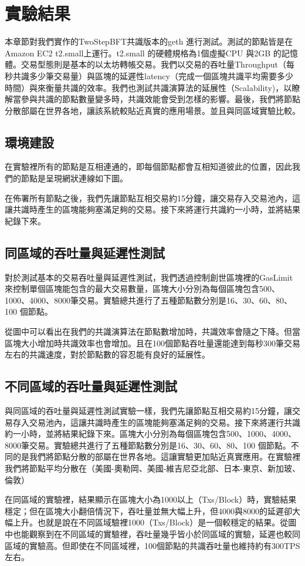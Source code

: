 \chapter{實驗結果} \label{se_6}
本章節對我們實作的TwoStepBFT共識版本的geth 進行測試。測試的節點皆是在Amazon EC2 t2.small上運行。t2.small 的硬體規格為1個虛擬CPU 與2GB 的記憶體。交易型態則是基本的以太坊轉帳交易。我們以交易的吞吐量Throughput（每秒共識多少筆交易量）與區塊的延遲性latency（完成一個區塊共識平均需要多少時間）與來衡量共識的效率。我們也測試共識演算法的延展性（Scalability)，以瞭解當參與共識的節點數量變多時，共識效能會受到怎樣的影響。最後，我們將節點分散部屬在世界各地，讓該系統較貼近真實的應用場景。並且與同區域實驗比較。
\section{環境建設}\label{se_6}
在實驗裡所有的節點是互相連通的，即每個節點都會互相知道彼此的位置，因此我們的節點是呈現網狀連線如下圖。

在佈署所有節點之後，我們先讓節點互相交易約15分鐘，讓交易存入交易池內，這讓共識時產生的區塊能夠塞滿足夠的交易。接下來將運行共識約一小時，並將結果紀錄下來。
\section{同區域的吞吐量與延遲性測試}\label{se_6}
對於測試基本的交易吞吐量與延遲性測試，我們透過控制創世區塊裡的GasLimit來控制單個區塊能包含的最大交易數量，區塊大小分別為每個區塊包含500、1000、4000、8000筆交易。實驗總共進行了五種節點數分別是16、30、60、80、100 個節點。
 
\newpage


從圖中可以看出在我們的共識演算法在節點數增加時，共識效率會隨之下降。但當區塊大小增加時共識效率也會增加。且在100個節點吞吐量還能達到每秒300筆交易左右的共識速度，對於節點數的容忍能有良好的延展性。



\section{不同區域的吞吐量與延遲性測試}\label{se_6}
與同區域的吞吐量與延遲性測試實驗一樣，我們先讓節點互相交易約15分鐘，讓交易存入交易池內，這讓共識時產生的區塊能夠塞滿足夠的交易。接下來將運行共識約一小時，並將結果紀錄下來。區塊大小分別為每個區塊包含500、1000、4000、8000筆交易。實驗總共進行了五種節點數分別是16、30、60、80、100 個節點。不同的是我們將節點分散的部屬在世界各地。這讓實驗更加貼近真實應用。在實驗裡我們將節點平均分散在（美國-奧勒岡、美國-維吉尼亞北部、日本-東京、新加玻、倫敦）



在同區域的實驗裡，結果顯示在區塊大小為1000以上（Txs/Block）時，實驗結果穩定；但在區塊大小翻倍情況下，吞吐量並無大幅上升，但4000與8000的延遲卻大幅上升。也就是說在不同區域驗裡1000（Txs/Block）是一個較穩定的結果。從圖中也能觀察到在不同區域的實驗裡，吞吐量幾乎皆小於同區域的實驗，延遲也較同區域的實驗高。但即使在不同區域裡，100個節點的共識吞吐量也維持約有300TPS左右。
%